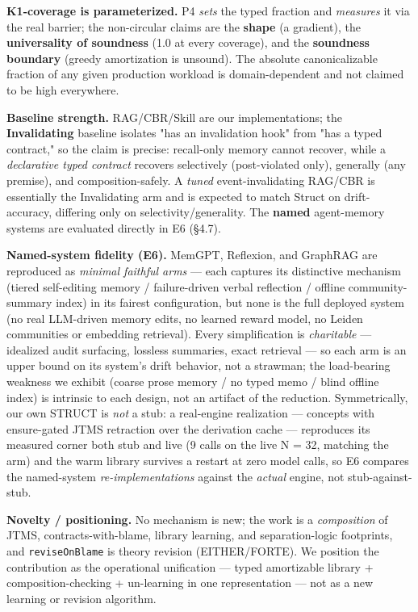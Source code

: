 \documentclass[11pt]{article}
\begin{document}
\textbf{K1-coverage is parameterized.} P4 \emph{sets} the typed fraction and \emph{measures} it via the real barrier; the non-circular claims are the \textbf{shape} (a gradient), the \textbf{universality of soundness} (1.0 at every coverage), and the \textbf{soundness boundary} (greedy amortization is unsound). The absolute canonicalizable fraction of any given production workload is domain-dependent and not claimed to be high everywhere.

\textbf{Baseline strength.} RAG/CBR/Skill are our implementations; the \textbf{Invalidating} baseline isolates "has an invalidation hook" from "has a typed contract," so the claim is precise: recall-only memory cannot recover, while a \emph{declarative typed contract} recovers selectively (post-violated only), generally (any premise), and composition-safely. A \emph{tuned} event-invalidating RAG/CBR is essentially the Invalidating arm and is expected to match Struct on drift-accuracy, differing only on selectivity/generality. The \textbf{named} agent-memory systems are evaluated directly in E6 (§4.7).

\textbf{Named-system fidelity (E6).} MemGPT, Reflexion, and GraphRAG are reproduced as \emph{minimal faithful arms} — each captures its distinctive mechanism (tiered self-editing memory / failure-driven verbal reflection / offline community-summary index) in its fairest configuration, but none is the full deployed system (no real LLM-driven memory edits, no learned reward model, no Leiden communities or embedding retrieval). Every simplification is \emph{charitable} — idealized audit surfacing, lossless summaries, exact retrieval — so each arm is an upper bound on its system's drift behavior, not a strawman; the load-bearing weakness we exhibit (coarse prose memory / no typed memo / blind offline index) is intrinsic to each design, not an artifact of the reduction. Symmetrically, our own STRUCT is \emph{not} a stub: a real-engine realization — concepts with ensure-gated JTMS retraction over the derivation cache — reproduces its measured corner both stub and live (9 calls on the live N = 32, matching the arm) and the warm library survives a restart at zero model calls, so E6 compares the named-system \emph{re-implementations} against the \emph{actual} engine, not stub-against-stub.

\textbf{Novelty / positioning.} No mechanism is new; the work is a \emph{composition} of JTMS, contracts-with-blame, library learning, and separation-logic footprints, and \texttt{reviseOnBlame} is theory revision (EITHER/FORTE). We position the contribution as the operational unification — typed amortizable library + composition-checking + un-learning in one representation — not as a new learning or revision algorithm.
\end{document}
